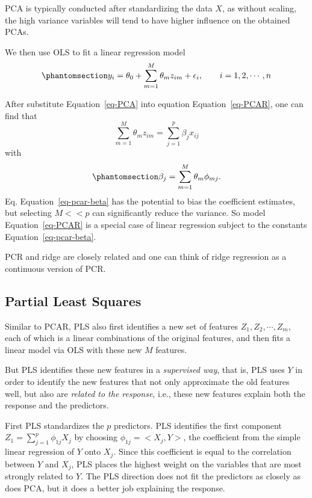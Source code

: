 \documentclass[
  letterpaper,
  DIV=11,
  numbers=noendperiod]{scrreprt}
\begin{document}
PCA is typically conducted after standardizing the data \(X\), as
without scaling, the high variance variables will tend to have higher
influence on the obtained PCAs.

We then use OLS to fit a linear regression model
\begin{equation}\phantomsection\label{eq-PCAR}{
y_i =\theta_0 +\sum_{m=1}^M \theta_m z_{im}+\epsilon_i, \qquad i=1,2,\cdots, n
}\end{equation}

After substitute Equation~\ref{eq-PCA} into equation
Equation~\ref{eq-PCAR}, one can find that \[
\sum_{m=1}^M \theta_mz_{im} =\sum_{j=1}^p \beta_jx_{ij}
\] with \begin{equation}\phantomsection\label{eq-pcar-beta}{
\beta_j = \sum_{m=1}^M \theta_m\phi_{mj}.
}\end{equation} Eq. Equation~\ref{eq-pcar-beta} has the potential to
bias the coefficient estimates, but selecting \(M<< p\) can
significantly reduce the variance. So model Equation~\ref{eq-PCAR} is a
special case of linear regression subject to the constants
Equation~\ref{eq-pcar-beta}.

PCR and ridge are closely related and one can think of ridge regression
as a continuous version of PCR.

\subsection{Partial Least Squares}\label{partial-least-squares}

Similar to PCAR, PLS also first identifies a new set of features
\(Z_1, Z_2, \cdots, Z_m\), each of which is a linear combinations of the
original features, and then fits a linear model via OLS with these new
\(M\) features.

But PLS identifies these new features in a \emph{supervised way}, that
is, PLS uses \(Y\) in order to identify the new features that not only
approximate the old features well, but also are \emph{related to the
response}, i.e., these new features explain both the response and the
predictors.

First PLS standardizes the \(p\) predictors. PLS identifies the first
component \(Z_1 = \sum_{j=1}^p \phi_{1j}X_j\) by choosing
\(\phi_{1j}=<X_j, Y>\), the coefficient from the simple linear
regression of \(Y\) onto \(X_j\). Since this coefficient is equal to the
correlation between \(Y\) and \(X_j\), PLS places the highest weight on
the variables that are most strongly related to \(Y\). The PLS direction
does not fit the predictors as closely as does PCA, but it does a better
job explaining the response.
\end{document}
